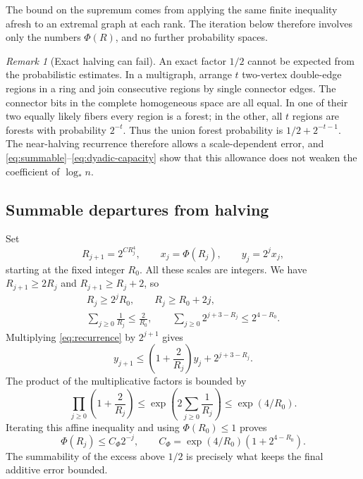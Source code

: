 \documentclass[11pt,a4paper]{article}
\numberwithin{equation}{section}
\theoremstyle{definition}
\theoremstyle{remark}
\newtheorem{remark}[theorem]{Remark}
\newcommand{\lstar}{\log_*}
\begin{document}
The bound on the supremum comes from applying the same finite inequality afresh to an extremal graph at each rank. The iteration below therefore involves only the numbers $\Phi(R)$, and no further probability spaces.

\begin{remark}[Exact halving can fail]
An exact factor $1/2$ cannot be expected from the probabilistic estimates. In a multigraph, arrange $t$ two-vertex double-edge regions in a ring and join consecutive regions by single connector edges. The connector bits in the complete homogeneous space are all equal. In one of their two equally likely fibers every region is a forest; in the other, all $t$ regions are forests with probability $2^{-t}$. Thus the union forest probability is $1/2+2^{-t-1}$. The near-halving recurrence therefore allows a scale-dependent error, and \eqref{eq:summable}--\eqref{eq:dyadic-capacity} show that this allowance does not weaken the coefficient of $\lstar n$.
\end{remark}

\subsection{Summable departures from halving}
Set
\[
 R_{j+1}=2^{CR_j^4},\qquad x_j=\Phi(R_j),\qquad y_j=2^jx_j,
\]
starting at the fixed integer $R_0$. All these scales are integers. We have $R_{j+1}\ge2R_j$ and $R_{j+1}\ge R_j+2$, so
\begin{equation}\label{eq:summable}
 \begin{gathered}
 R_j\ge2^jR_0,\qquad R_j\ge R_0+2j,\\
 \sum_{j\ge0}\frac1{R_j}\le\frac2{R_0},\qquad
 \sum_{j\ge0}2^{j+3-R_j}\le2^{4-R_0}.
 \end{gathered}
\end{equation}
Multiplying \eqref{eq:recurrence} by $2^{j+1}$ gives
\[
 y_{j+1}\le\left(1+\frac2{R_j}\right)y_j+2^{j+3-R_j}.
\]
The product of the multiplicative factors is bounded by
\[
 \prod_{j\ge0}\left(1+\frac2{R_j}\right)
 \le\exp\left(2\sum_{j\ge0}\frac1{R_j}\right)\le\exp(4/R_0).
\]
Iterating this affine inequality and using $\Phi(R_0)\le1$ proves
\begin{equation}\label{eq:dyadic-capacity}
 \Phi(R_j)\le C_\Phi2^{-j},\qquad
 C_\Phi=\exp(4/R_0)(1+2^{4-R_0}).
\end{equation}
The summability of the excess above $1/2$ is precisely what keeps the final additive error bounded.
\end{document}
